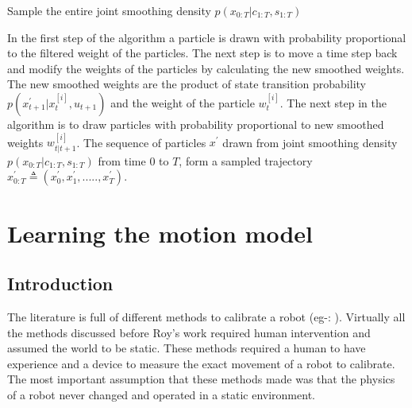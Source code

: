 \documentclass[12pt]{dalcsthesis}
\begin{document}
\begin{algorithm}[H]
 \SetAlgoLined
  	\label{alg:Particle Smoothing}
	\caption{Sample the entire joint smoothing density $p(x_{0:T}|c_{1:T},s_{1:T})$}
	
\end{algorithm}

In the first step of the algorithm a particle is drawn with probability proportional to the filtered weight of the particles. The next step is to move a time step back and modify the weights of the particles by calculating the new smoothed weights. The new smoothed weights are the product of state transition probability $p(x ^{'} _{t+1}|x_{t}^{[i]},u _{t+1})$ and the weight of the particle $w_{t}^{[i]}$. The next step in the algorithm is to draw particles with probability proportional to new smoothed weights $w_{t|t+1}^{[i]}$.  The sequence of particles $x^{'}$ drawn from joint smoothing density $p(x_{0:T}|c_{1:T},s_{1:T})$ from time $0$ to $T$, form a sampled trajectory $x^{'}_{0:T} \triangleq (x^{'}_0,x^{'}_1,.....,x^{'}_T)$.
 
\chapter{Learning the motion model}
\label{learning the motion model}
\section{Introduction}
The literature is full of different methods to calibrate a robot (eg-: \cite{cox1990autonomous} \cite{vukobratovic1989introduction}). Virtually all the methods discussed before Roy's work \cite{Roy} required human intervention and assumed the world to be static. These methods required a human to have experience and a device to measure the exact movement of a robot to calibrate. The most important assumption that these methods made was that the physics of a robot never changed and operated in a static environment. 
\end{document}
